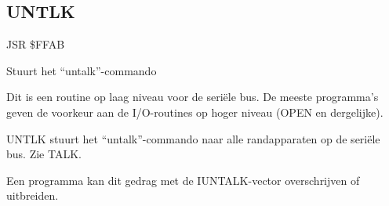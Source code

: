 
\newpage
\subsection{UNTLK}
\label{KERNAL Jump Table!UNTLK}
\begin{description}[leftmargin=2cm,style=nextline]
    \item [Adres:] JSR \$FFAB    \item [Omschrijving:] Stuurt het ``untalk''-commando    \item [Opmerkingen:]        Dit is een routine op laag niveau voor de seriële bus. De meeste programma's geven de voorkeur aan de I/O-routines op hoger niveau (OPEN en dergelijke).

        UNTLK stuurt het ``untalk''-commando naar alle randapparaten op de seriële bus. Zie TALK.

        Een programma kan dit gedrag met de IUNTALK-vector overschrijven of uitbreiden.    \item [Voorbeeld:]
\end{description}



\newpage
